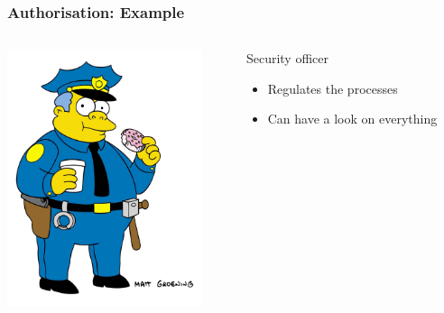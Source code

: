 \documentclass{beamer}
\begin{document}
\begin{frame}
\frametitle{Authorisation: Example}
\begin{columns}
 \begin{column}{0.45\textwidth}
         \includegraphics[height=7.5cm]{./pics/simpsons/police_Wiggum_Clancy.png}
 \end{column}
 \begin{column}{0.45\textwidth}
    \begin{block}{Security officer}
        \begin{itemize}
            \item Regulates the processes
            \item Can have a look on everything 
        \end{itemize}
    \end{block}
 \end{column}
\end{columns}
\end{frame}
\end{document}
